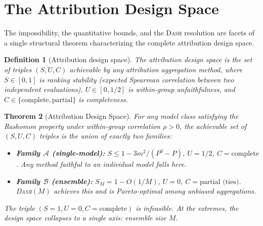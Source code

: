 \documentclass{article}
\newtheorem{theorem}{Theorem}
\newtheorem{definition}[theorem]{Definition}
\newcommand{\DASH}{\textsc{Dash}}
\begin{document}

\section{The Attribution Design Space}
\label{sec:design-space}

The impossibility, the quantitative bounds, and the \DASH{} resolution are facets of a single structural theorem characterizing the complete attribution design space.

\begin{definition}[Attribution design space]
\label{def:design-space-def}
The \emph{attribution design space} is the set of triples $(S, U, C)$ achievable by any attribution aggregation method, where $S \in [0,1]$ is ranking stability (expected Spearman correlation between two independent evaluations), $U \in [0, 1/2]$ is within-group unfaithfulness, and $C \in \{\text{complete}, \text{partial}\}$ is completeness.
\end{definition}

\begin{theorem}[Attribution Design Space]
\label{thm:design-space-main}
For any model class satisfying the Rashomon property under within-group correlation $\rho > 0$, the achievable set of $(S, U, C)$ triples is the union of exactly two families:
\begin{itemize}
    \item \textbf{Family $\mathcal{A}$ (single-model):} $S \leq 1 - 3m^2/(P^3{-}P)$, $U = 1/2$, $C = \text{complete}$. Any method faithful to an individual model falls here.
    \item \textbf{Family $\mathcal{B}$ (ensemble):} $S_M = 1 - O(1/M)$, $U = 0$, $C = \text{partial (ties)}$. \DASH{}$(M)$ achieves this and is Pareto-optimal among unbiased aggregations.
\end{itemize}
The triple $(S{=}1, U{=}0, C{=}\text{complete})$ is infeasible. At the extremes, the design space collapses to a single axis: ensemble size $M$.
\end{theorem}
\end{document}
